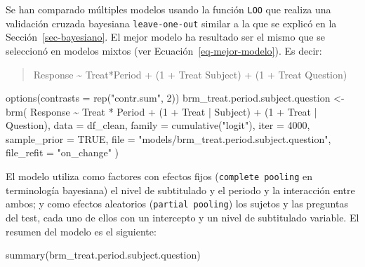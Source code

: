 \documentclass[
  12pt,
  a4paper,
  extrafontsizes,
  onecolumn,
  openright,
  table]{memoir}
\newenvironment{Shaded}{\begin{snugshade}}{\end{snugshade}}
\newcommand{\AttributeTok}[1]{\textcolor[rgb]{0.40,0.45,0.13}{#1}}
\newcommand{\ConstantTok}[1]{\textcolor[rgb]{0.56,0.35,0.01}{#1}}
\newcommand{\DecValTok}[1]{\textcolor[rgb]{0.68,0.00,0.00}{#1}}
\newcommand{\FunctionTok}[1]{\textcolor[rgb]{0.28,0.35,0.67}{#1}}
\newcommand{\NormalTok}[1]{\textcolor[rgb]{0.00,0.23,0.31}{#1}}
\newcommand{\OtherTok}[1]{\textcolor[rgb]{0.00,0.23,0.31}{#1}}
\newcommand{\SpecialCharTok}[1]{\textcolor[rgb]{0.37,0.37,0.37}{#1}}
\newcommand{\StringTok}[1]{\textcolor[rgb]{0.13,0.47,0.30}{#1}}
\begin{document}
Se han comparado múltiples modelos usando la función \texttt{LOO} que
realiza una validación cruzada bayesiana \texttt{leave-one-out} similar
a la que se explicó en la Sección~\ref{sec-bayesiano}. El mejor modelo
ha resultado ser el mismo que se seleccionó en modelos mixtos (ver
Ecuación~\ref{eq-mejor-modelo}). Es decir:

\small

\begin{quote}
Response \textasciitilde{} Treat*Period + (1 + Treat \textbar{} Subject)
+ (1 + Treat \textbar{} Question) \normalsize
\end{quote}

\scriptsize

\begin{Shaded}
\begin{Highlighting}[]
\FunctionTok{options}\NormalTok{(}\AttributeTok{contrasts =} \FunctionTok{rep}\NormalTok{(}\StringTok{"contr.sum"}\NormalTok{, }\DecValTok{2}\NormalTok{))}
\NormalTok{brm\_treat.period.subject.question }\OtherTok{\textless{}{-}} \FunctionTok{brm}\NormalTok{(}
\NormalTok{    Response }\SpecialCharTok{\textasciitilde{}}\NormalTok{ Treat }\SpecialCharTok{*}\NormalTok{ Period }\SpecialCharTok{+}\NormalTok{ (}\DecValTok{1} \SpecialCharTok{+}\NormalTok{ Treat }\SpecialCharTok{|}\NormalTok{ Subject) }\SpecialCharTok{+}\NormalTok{ (}\DecValTok{1} \SpecialCharTok{+}\NormalTok{ Treat }\SpecialCharTok{|}\NormalTok{ Question),}
    \AttributeTok{data =}\NormalTok{ df\_clean,}
    \AttributeTok{family =} \FunctionTok{cumulative}\NormalTok{(}\StringTok{"logit"}\NormalTok{),}
    \AttributeTok{iter =} \DecValTok{4000}\NormalTok{,}
    \AttributeTok{sample\_prior =} \ConstantTok{TRUE}\NormalTok{,}
    \AttributeTok{file =} \StringTok{"models/brm\_treat.period.subject.question"}\NormalTok{,}
    \AttributeTok{file\_refit =} \StringTok{"on\_change"}
\NormalTok{)}
\end{Highlighting}
\end{Shaded}

\normalsize

El modelo utiliza como factores con efectos fijos
(\texttt{complete\ pooling} en terminología bayesiana) el nivel de
subtitulado y el periodo y la interacción entre ambos; y como efectos
aleatorios (\texttt{partial\ pooling}) los sujetos y las preguntas del
test, cada uno de ellos con un intercepto y un nivel de subtitulado
variable. El resumen del modelo es el siguiente:

\tiny

\begin{Shaded}
\begin{Highlighting}[]
\FunctionTok{summary}\NormalTok{(brm\_treat.period.subject.question)}
\end{Highlighting}
\end{Shaded}
\end{document}
